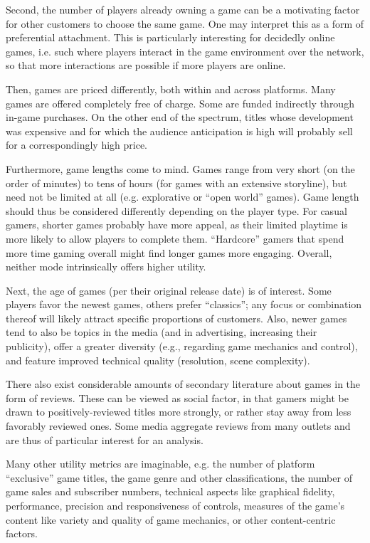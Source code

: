 Second, the number of players already owning a game can be a
motivating factor for other customers to choose the same game.
One may interpret this as a form of preferential attachment.
This is particularly interesting for decidedly online games, i.e.
such where players interact in the game environment over the network,
so that more interactions are possible if more players are online.

Then, games are priced differently, both within and across
platforms. Many games are offered completely free of charge.
Some are funded indirectly through in-game purchases. On the
other end of the spectrum, titles whose development was expensive
and for which the audience anticipation is high will probably sell
for a correspondingly high price.

Furthermore, game lengths come to mind. Games range from very short
(on the order
of minutes) to tens of hours (for games with an extensive storyline),
but need not be limited at all (e.g. explorative or ``open world'' games).
Game length should thus be considered differently depending on
the player type. For casual gamers, shorter games probably have
more appeal, as their limited playtime is more likely to allow
players to complete them. ``Hardcore'' gamers that spend more
time gaming overall might find longer games more engaging.
Overall, neither mode intrinsically offers higher utility.

Next, the age of games (per their original release date) is of
interest. Some players favor the newest games, others prefer ``classics'';
any focus or combination thereof will likely attract specific
proportions of customers. Also, newer games tend to also be topics
in the media (and in advertising, increasing their publicity),
offer a greater diversity (e.g., regarding game mechanics and control),
and feature improved technical quality (resolution, scene complexity).


There also exist considerable amounts of secondary literature about
games in the form of reviews. These can be viewed as social factor,
in that gamers might be drawn to positively-reviewed titles more
strongly, or rather stay away from less favorably reviewed ones.
Some media aggregate reviews from many outlets and
are thus of particular interest for an analysis.

Many other utility metrics are imaginable, e.g.
the number of platform ``exclusive'' game titles,
the game genre and other classifications,
the number of game sales and subscriber numbers,
technical aspects like graphical fidelity, performance, precision
and responsiveness of controls,
measures of the game's content like variety and quality of game mechanics,
or other content-centric factors.


